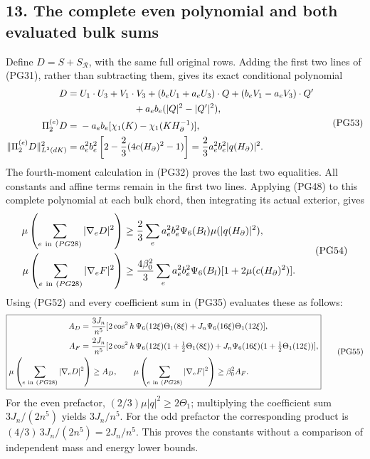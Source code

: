 \documentclass[11pt]{article}
\begin{document}
\subsection*{13. The complete even polynomial and both evaluated bulk sums}

Define \(D=S+S_{\mathcal R}\), with the same full original rows.
Adding the first two lines of (PG31), rather than subtracting
them, gives its exact conditional polynomial
\[
 \begin{aligned}
 D={}&U_1\cdot U_3+V_1\cdot V_3
 +(b_eU_1+a_eU_3)\cdot Q
 +(b_eV_1-a_eV_3)\cdot Q'\\
 &\hspace{20mm}+a_eb_e(|Q|^2-|Q'|^2),\\
 \Pi_2^{(e)}D={}&-a_eb_e[\chi_1(K)-\chi_1(KH_\partial^{-1})],\\
 \|\Pi_2^{(e)}D\|_{L^2(dK)}^2
 ={}&a_e^2b_e^2\left[2-\frac23(4c(H_\partial)^2-1)\right]
   =\frac23a_e^2b_e^2|q(H_\partial)|^2 .
 \end{aligned}\tag{PG53}
\]
The fourth-moment calculation in (PG32) proves the last two
equalities. All constants and affine terms remain in the first
two lines. Applying (PG48) to this complete polynomial at each
bulk chord, then integrating its actual exterior, gives
\[
 \begin{aligned}
 \mu\left(\sum_{e\ {\rm in}\ (PG28)}|\nabla_eD|^2\right)
 &\ge\frac23\sum_ea_e^2b_e^2\Psi_6(B_l)
                            \mu(|q(H_\partial)|^2),\\
 \mu\left(\sum_{e\ {\rm in}\ (PG28)}|\nabla_eF|^2\right)
 &\ge\frac{4\beta_0^2}{3}
       \sum_ea_e^2b_e^2\Psi_6(B_l)
                            [1+2\mu(c(H_\partial)^2)] .
 \end{aligned}\tag{PG54}
\]
Using (PG52) and every coefficient sum in (PG35) evaluates these
as follows:
\[
 \boxed{\begin{aligned}
 A_D={}&\frac{3J_n}{n^5}
   [2\cos^2h\,\Psi_6(12\xi)\Theta_1(8\xi)
                 +J_n\Psi_6(16\xi)\Theta_1(12\xi)],\\
 A_F={}&\frac{2J_n}{n^5}
   [2\cos^2h\,\Psi_6(12\xi)(1+\tfrac12\Theta_1(8\xi))
                 +J_n\Psi_6(16\xi)(1+\tfrac12\Theta_1(12\xi))],\\
 \mu\left(\sum_{e\ {\rm in}\ (PG28)}|\nabla_eD|^2\right)&\ge A_D,
 \qquad
 \mu\left(\sum_{e\ {\rm in}\ (PG28)}|\nabla_eF|^2\right)
                                                    \ge\beta_0^2A_F .
 \end{aligned}}\tag{PG55}
\]
For the even prefactor, \((2/3)\mu|q|^2\ge2\Theta_1\);
multiplying the coefficient sum \(3J_n/(2n^5)\) yields
\(3J_n/n^5\). For the odd prefactor the corresponding product
is \((4/3)\,3J_n/(2n^5)=2J_n/n^5\).
This proves the constants without a comparison of independent
mass and energy lower bounds.
\end{document}
